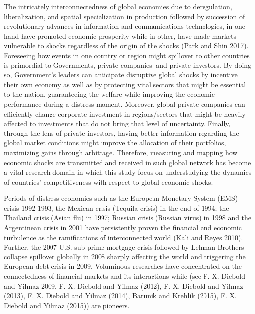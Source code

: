 \documentclass[]{elsarticle} %
\begin{document}
The intricately interconnectedness of global economies due to
deregulation, liberalization, and spatial specialization in production
followed by succession of revolutionary advances in information and
communications technologies, in one hand have promoted economic
prosperity while in other, have made markets vulnerable to shocks
regardless of the origin of the shocks \citep{Park2017} (Park and Shin
2017). Foreseeing how events in one country or region might spillover to
other countries is primordial to Governments, private companies, and
private investors. By doing so, Government's leaders can anticipate
disruptive global shocks by incentive their own economy as well as by
protecting vital sectors that might be essential to the nation,
guaranteeing the welfare while improving the economic performance during
a distress moment. Moreover, global private companies can efficiently
change corporate investment in regions/sectors that might be heavily
affected to investments that do not bring that level of uncertainty.
Finally, through the lens of private investors, having better
information regarding the global market conditions might improve the
allocation of their portfolios, maximizing gains through arbitrage.
Therefore, measuring and mapping how economic shocks are transmitted and
received in such global network has become a vital research domain in
which this study focus on understudying the dynamics of countries'
competitiveness with respect to global economic shocks.

Periods of distress economies such as the European Monetary System (EMS)
crisis 1992-1993, the Mexican crisis (Tequila crisis) in the end of
1994; the Thailand crisis (Asian flu) in 1997; Russian crisis (Russian
virus) in 1998 and the Argentinean crisis in 2001 have persistently
proven the financial and economic turbulence as the ramifications of
interconnected world (Kali and Reyes 2010). Further, the 2007 U.S.
sub-prime mortgage crisis followed by Lehman Brothers collapse spillover
globally in 2008 sharply affecting the world and triggering the European
debt crisis in 2009. Voluminous researches have concentrated on the
connectedness of financial markets and its interactions while (see F. X.
Diebold and Yilmaz 2009, F. X. Diebold and Yilmaz (2012), F. X. Diebold
and Yilmaz (2013), F. X. Diebold and Yilmaz (2014), Barunik and Krehlik
(2015), F. X. Diebold and Yilmaz (2015)) are pioneers.
\end{document}
